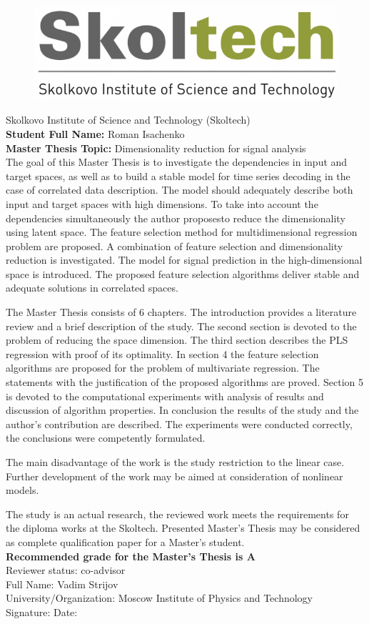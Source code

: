 \documentclass[12pt,oneside]{article}
\theoremstyle{definition}
\begin{document}
	\thispagestyle{empty}
	\begin{figure}
		\centering
		\includegraphics[width=0.38\linewidth]{sk_logo}
	\end{figure}
	 Skolkovo Institute of Science and Technology (Skoltech) \\
	{\bf Student Full Name:} Roman Isachenko \\
	{\bf Master Thesis Topic:} Dimensionality reduction for signal analysis \\


The goal of this Master Thesis is to investigate the dependencies in input and target spaces, as well as to build a stable model for time series decoding in the case of correlated data description.
The model should adequately describe both input and target spaces with high dimensions.
To take into account the dependencies simultaneously the author proposesto reduce the dimensionality using latent space.
The feature selection method for multidimensional regression problem are proposed.
A combination of feature selection and dimensionality reduction is investigated.
The model for signal prediction in the high-dimensional space is introduced.
The proposed feature selection algorithms deliver stable and adequate solutions in correlated spaces.

The Master Thesis consists of 6 chapters.
The introduction provides a literature review and a brief description of the study.
The second section is devoted to the problem of reducing the space dimension.
The third section describes the PLS regression with proof of its optimality.
In section 4 the feature selection algorithms are proposed for the problem of multivariate regression. 
The statements with the justification of the proposed algorithms are proved.
Section 5 is devoted to the computational experiments with analysis of results and discussion of algorithm properties.
In conclusion the results of the study and the author's contribution are described.
The experiments were conducted correctly, the conclusions were competently formulated.

The main disadvantage of the work is the study restriction to the linear case. Further development of the work may be aimed at consideration of nonlinear models.

The study is an actual research, the reviewed work meets the requirements for the diploma works at the Skoltech. 
Presented Master’s Thesis may be considered as complete qualification paper for a Master’s student. \\[4mm]
{\bf Recommended grade for the Master’s Thesis is A}\\[4mm]
Reviewer status:  co-advisor \\[2mm]
Full Name: Vadim Strijov\\[2mm]
University/Organization: Moscow Institute of Physics and Technology\\[4mm]
Signature: \hspace{7cm}Date:
\end{document}
